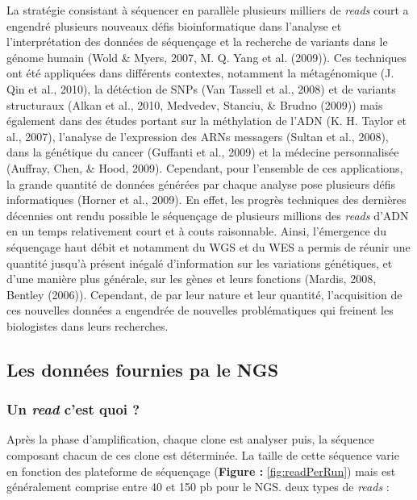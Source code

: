 \documentclass[12pt,twoside]{reedthesis}
\theoremstyle{definition}
\theoremstyle{definition}
\theoremstyle{remark}
\begin{document}
  La stratégie consistant à séquencer en parallèle plusieurs milliers de
  \emph{reads} court a engendré plusieurs nouveaux défis bioinformatique
  dans l'analyse et l'interprétation des données de séquençage et la
  recherche de variants dans le génome humain (Wold \& Myers, 2007, M. Q.
  Yang et al. (2009)). Ces techniques ont été appliquées dans différents
  contextes, notamment la métagénomique (J. Qin et al., 2010), la
  détéction de SNPs (Van Tassell et al., 2008) et de variants structuraux
  (Alkan et al., 2010, Medvedev, Stanciu, \& Brudno (2009)) mais également
  dans des études portant sur la méthylation de l'ADN (K. H. Taylor et
  al., 2007), l'analyse de l'expression des ARNs messagers (Sultan et al.,
  2008), dans la génétique du cancer (Guffanti et al., 2009) et la
  médecine personnalisée (Auffray, Chen, \& Hood, 2009). Cependant, pour
  l'ensemble de ces applications, la grande quantité de données générées
  par chaque analyse pose plusieurs défis informatiques (Horner et al.,
  2009). En effet, les progrès techniques des dernières décennies ont
  rendu possible le séquençage de plusieurs millions des \emph{reads}
  d'ADN en un temps relativement court et à couts raisonnable. Ainsi,
  l'émergence du séquençage haut débit et notamment du WGS et du WES a
  permis de réunir une quantité jusqu'à présent inégalé d'information sur
  les variations génétiques, et d'une manière plus générale, sur les gènes
  et leurs fonctions (Mardis, 2008, Bentley (2006)). Cependant, de par
  leur nature et leur quantité, l'acquisition de ces nouvelles données a
  engendrée de nouvelles problématiques qui freinent les biologistes dans
  leurs recherches.
  
  \subsection{Les données fournies pa le
  NGS}\label{les-donnees-fournies-pa-le-ngs}
  
  \subsubsection{\texorpdfstring{Un \emph{read} c'est quoi
  ?}{Un read c'est quoi ?}}\label{un-read-cest-quoi}
  
  Après la phase d'amplification, chaque clone est analyser puis, la
  séquence composant chacun de ces clone est déterminée. La taille de
  cette séquence varie en fonction des plateforme de séquençage
  (\textbf{Figure : }\ref{fig:readPerRun}) mais est généralement comprise
  entre 40 et 150 pb pour le NGS. deux types de \emph{reads} :
  
\end{document}

